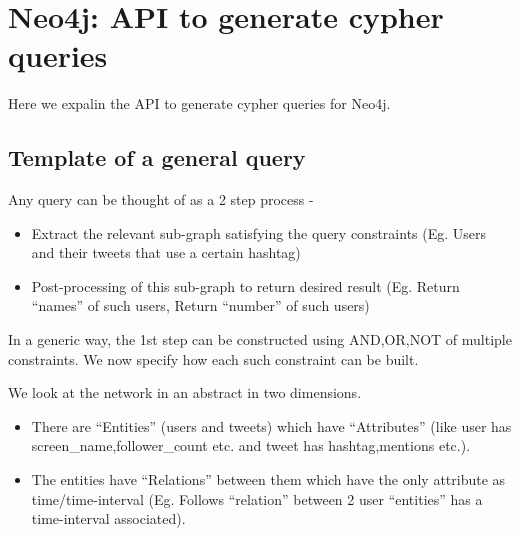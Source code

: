 \documentclass[letterpaper,10pt,english]{sphinxmanual}
\begin{document}

\begin{fulllineitems}
\label{\detokenize{mongoDB_data_ingestion:ingest_raw.threaded}}
\end{fulllineitems}



\chapter{Neo4j: API to generate cypher queries}
\label{\detokenize{neo4j_query_generation::doc}}\label{\detokenize{neo4j_query_generation:neo4j-api-to-generate-cypher-queries}}
Here we expalin the API to generate cypher queries for Neo4j.


\section{Template of a general query}
\label{\detokenize{neo4j_query_generation:template-of-a-general-query}}
Any query can be thought of as a 2 step process -
\begin{itemize}
\item {} 
Extract the relevant sub-graph satisfying the query constraints (Eg. Users and their tweets that use a certain hashtag)

\item {} 
Post-processing of this sub-graph to return desired result (Eg. Return “names” of such users, Return “number” of such users)

\end{itemize}

In a generic way, the 1st step can be constructed using AND,OR,NOT of multiple constraints. We now specify how each such constraint can be built.

We look at the network in an abstract in two dimensions.
\begin{itemize}
\item {} 
There are “Entities” (users and tweets) which have “Attributes” (like user has screen\_name,follower\_count etc. and tweet has hashtag,mentions etc.).

\item {} 
The entities have “Relations” between them which have the only attribute as time/time-interval (Eg. Follows “relation” between 2 user “entities” has a time-interval associated).

\end{itemize}
\end{document}
